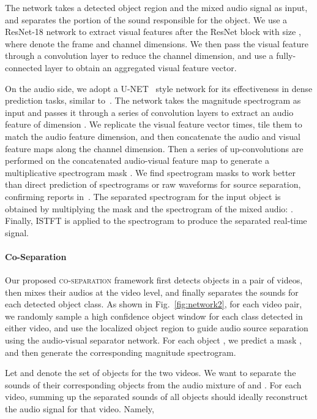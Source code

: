 \documentclass[10pt,twocolumn,letterpaper]{article}
\begin{document}
The network takes a detected object region and the mixed audio signal as input, and separates the portion of the sound responsible for the object. We use a ResNet-18 network to extract visual features after the  ResNet block with size , where  denote the frame and channel dimensions. We then pass the visual feature through a  convolution layer to reduce the channel dimension, and use a fully-connected layer to obtain an aggregated visual feature vector.

On the audio side, we adopt a U-NET~\cite{ronneberger2015u} style network for its effectiveness in dense prediction tasks, similar to~\cite{zhao2018sound,owens2018audio,gao2019visualsound}. The network takes the magnitude spectrogram  as input and passes it through a series of convolution layers to extract an audio feature of dimension . We replicate the visual feature vector  times, tile them to match the audio feature dimension, and then concatenate the audio and visual feature maps along the channel dimension. Then a series of up-convolutions are performed on the concatenated audio-visual feature map to generate a multiplicative spectrogram mask . We find spectrogram masks to work better than direct prediction of spectrograms or raw waveforms for source separation, confirming reports in~\cite{wang2018supervised,ephrat2018looking,gao2019visualsound}. The separated spectrogram for the input object is obtained by multiplying the mask and the spectrogram of the mixed audio:  . Finally, ISTFT is applied to the spectrogram to produce the separated real-time signal. 

\vspace*{-0.2in}
\paragraph{Co-Separation}
Our proposed \textsc{co-separation} framework first detects objects in a pair of videos, then mixes their audios at the video level, and finally separates the sounds for each detected object class. As shown in Fig.~\ref{fig:network2}, for each video pair, we randomly sample a high confidence object window for each class detected in either video, and use the localized object region to guide audio source separation using the audio-visual separator network. For each object , we predict a mask , and then generate the corresponding magnitude spectrogram. 

Let  and  denote the set of objects for the two videos. We want to separate the sounds of their corresponding objects from the audio mixture of  and . For each video, summing up the separated sounds of all objects should ideally reconstruct the audio signal for that video. Namely, 
\vspace*{-0.05in}
\end{document}
